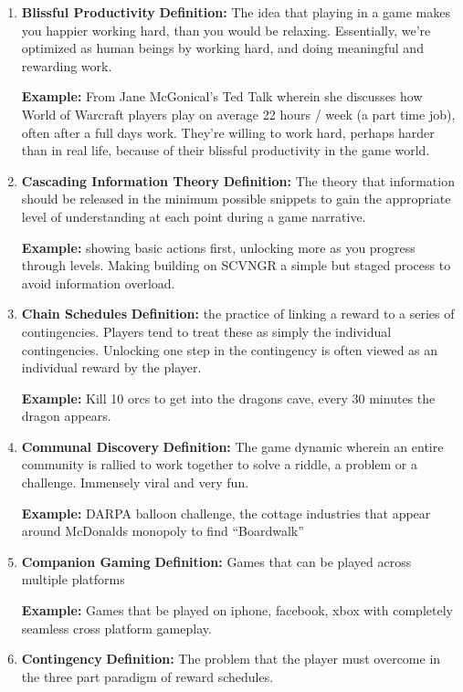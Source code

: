 \begin{enumerate}
\item \textbf{Blissful Productivity}
\textbf{Definition:} The idea that playing in a game makes you happier working hard, than you would be relaxing. Essentially, we’re optimized as human beings by working hard, and doing meaningful and rewarding work.

\textbf{Example:} From Jane McGonical’s Ted Talk wherein she discusses how World of Warcraft players play on average 22 hours / week (a part time job), often after a full days work. They’re willing to work hard, perhaps harder than in real life, because of their blissful productivity in the game world.

\item \textbf{Cascading Information Theory}
\textbf{Definition:} The theory that information should be released in the minimum possible snippets to gain the appropriate level of understanding at each point during a game narrative.

\textbf{Example:} showing basic actions first, unlocking more as you progress through levels. Making building on SCVNGR a simple but staged process to avoid information overload.

\item \textbf{Chain Schedules}
\textbf{Definition:} the practice of linking a reward to a series of contingencies. Players tend to treat these as simply the individual contingencies. Unlocking one step in the contingency is often viewed as an individual reward by the player.

\textbf{Example:} Kill 10 orcs to get into the dragons cave, every 30 minutes the dragon appears.

\item \textbf{Communal Discovery}
\textbf{Definition:} The game dynamic wherein an entire community is rallied to work together to solve a riddle, a problem or a challenge. Immensely viral and very fun.

\textbf{Example:} DARPA balloon challenge, the cottage industries that appear around McDonalds monopoly to find “Boardwalk”

\item \textbf{Companion Gaming}
\textbf{Definition:} Games that can be played across multiple platforms

\textbf{Example:} Games that be played on iphone, facebook, xbox with completely seamless cross platform gameplay.

\item \textbf{Contingency}
\textbf{Definition:} The problem that the player must overcome in the three part paradigm of reward schedules.


\end{enumerate}
